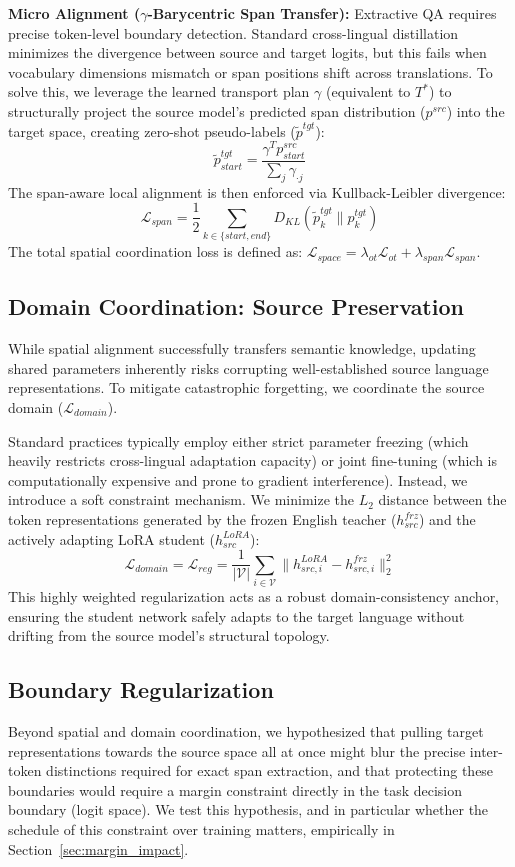 \documentclass[11pt]{article}
\begin{document}
\textbf{Micro Alignment ($\gamma$-Barycentric Span Transfer):} Extractive QA requires precise token-level boundary detection. Standard cross-lingual distillation minimizes the divergence between source and target logits, but this fails when vocabulary dimensions mismatch or span positions shift across translations. To solve this, we leverage the learned transport plan $\gamma$ (equivalent to $T^*$) to structurally project the source model's predicted span distribution ($p^{src}$) into the target space, creating zero-shot pseudo-labels ($\tilde{p}^{tgt}$):
$$ \tilde{p}^{tgt}_{start} = \frac{\gamma^T p^{src}_{start}}{\sum_j \gamma_{\cdot j}} $$
The span-aware local alignment is then enforced via Kullback-Leibler divergence:
$$ \mathcal{L}_{span} = \frac{1}{2} \sum_{k \in \{start, end\}} D_{KL}(\tilde{p}^{tgt}_{k} \| p^{tgt}_{k}) $$
The total spatial coordination loss is defined as: $\mathcal{L}_{space} = \lambda_{ot}\mathcal{L}_{ot} + \lambda_{span}\mathcal{L}_{span}$.

\subsection{Domain Coordination: Source Preservation}
\label{sec:domain}
While spatial alignment successfully transfers semantic knowledge, updating shared parameters inherently risks corrupting well-established source language representations. To mitigate catastrophic forgetting, we coordinate the source domain ($\mathcal{L}_{domain}$).

Standard practices typically employ either strict parameter freezing (which heavily restricts cross-lingual adaptation capacity) or joint fine-tuning (which is computationally expensive and prone to gradient interference). Instead, we introduce a soft constraint mechanism. We minimize the $L_2$ distance between the token representations generated by the frozen English teacher ($h^{frz}_{src}$) and the actively adapting LoRA student ($h^{LoRA}_{src}$):
$$ \mathcal{L}_{domain} = \mathcal{L}_{reg} = \frac{1}{|\mathcal{V}|} \sum_{i \in \mathcal{V}} \| h^{LoRA}_{src,i} - h^{frz}_{src,i} \|^2_2 $$
This highly weighted regularization acts as a robust domain-consistency anchor, ensuring the student network safely adapts to the target language without drifting from the source model's structural topology.

\subsection{Boundary Regularization}
\label{sec:temporal}
Beyond spatial and domain coordination, we hypothesized that pulling target representations towards the source space all at once might blur the precise inter-token distinctions required for exact span extraction, and that protecting these boundaries would require a margin constraint directly in the task decision boundary (logit space). We test this hypothesis, and in particular whether the schedule of this constraint over training matters, empirically in Section~\ref{sec:margin_impact}.
\end{document}

